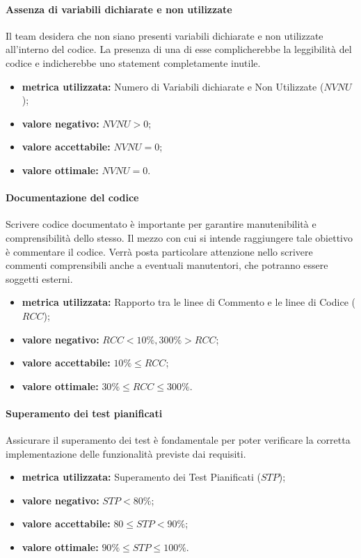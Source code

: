 		\paragraph{Assenza di variabili dichiarate e non utilizzate}
			\label{OADVDENU}
			Il team desidera che non siano presenti variabili dichiarate e non utilizzate all'interno del codice. La presenza di una di esse complicherebbe la leggibilità del codice e indicherebbe uno statement completamente inutile.
			\begin{itemize}
				\item \textbf{metrica utilizzata:} Numero di Variabili dichiarate e Non Utilizzate ($NVNU$);
				\item \textbf{valore negativo:} $NVNU>0$;
				\item \textbf{valore accettabile:} $NVNU=0$;
				\item \textbf{valore ottimale:} $NVNU=0$.
			\end{itemize}


		\paragraph{Documentazione del codice}
			\label{ODDC}
			Scrivere codice documentato è importante per garantire manutenibilità e comprensibilità dello stesso. Il mezzo con cui si intende raggiungere tale obiettivo è commentare il codice. Verrà posta particolare attenzione nello scrivere commenti comprensibili anche a eventuali manutentori, che potranno  essere soggetti esterni.
			\begin{itemize}
				\item \textbf{metrica utilizzata:} Rapporto tra le linee di Commento e le linee di Codice ($RCC$);
				\item \textbf{valore negativo:} $RCC<10\% , 300\%>RCC$;
				\item \textbf{valore accettabile:} $10\% \leq RCC$;
				\item \textbf{valore ottimale:} $30\% \leq RCC\leq 300\%$.
			\end{itemize}

		
		\paragraph{Superamento dei test pianificati}
			\label{OSDTP}
			Assicurare il superamento dei test è fondamentale per poter verificare la corretta implementazione delle funzionalità previste dai requisiti.
				\begin{itemize}
					\item \textbf{metrica utilizzata:} Superamento dei Test Pianificati ($STP$);
					\item \textbf{valore negativo:} $STP<80\%$;
					\item \textbf{valore accettabile:} $80\leq STP<90\%$;
					\item \textbf{valore ottimale:} $90\% \leq STP \leq 100\%$.
				\end{itemize}

